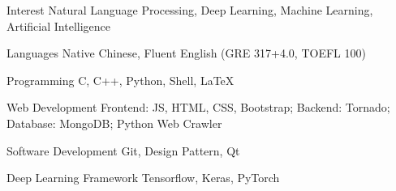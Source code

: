 

\begin{cvskills}


  \cvskill
    {Interest} %
    {Natural Language Processing, Deep Learning, Machine Learning, Artificial Intelligence} %

    

  \cvskill
    {Languages} %
    {Native Chinese, Fluent English (GRE 317+4.0, TOEFL 100)} %


  \cvskill
    {Programming} %
    {C, C++, Python, Shell, LaTeX} %

  \cvskill
    {Web Development} %
    {Frontend: JS, HTML, CSS, Bootstrap; Backend: Tornado; Database: MongoDB; Python Web Crawler} %

  \cvskill
    {Software Development} %
    {Git, Design Pattern, Qt} %

  \cvskill
    {Deep Learning Framework} %
    {Tensorflow, Keras, PyTorch} %

\end{cvskills}
